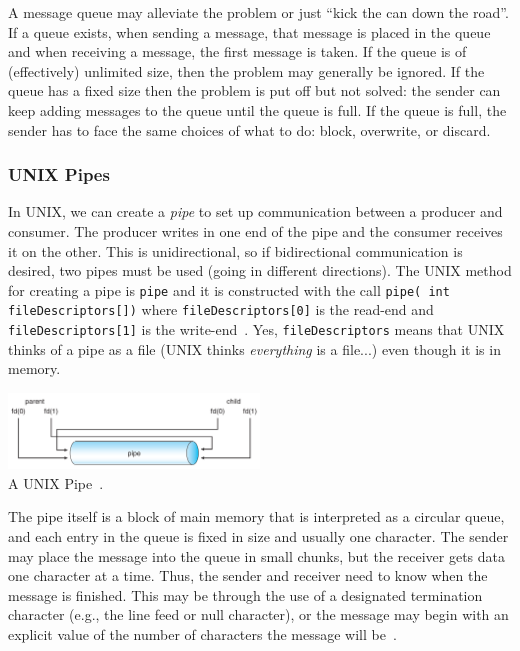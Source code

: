 A message queue may alleviate the problem or just ``kick the can down the road''. If a queue exists, when sending a message, that message is placed in the queue and when receiving a message, the first message is taken. If the queue is of (effectively) unlimited size, then the problem may generally be ignored. If the queue has a fixed size then the problem is put off but not solved: the sender can keep adding messages to the queue until the queue is full. If the queue is full, the sender has to face the same choices of what to do: block, overwrite, or discard.

\subsubsection*{UNIX Pipes}

In UNIX, we can create a \textit{pipe} to set up communication between a producer and consumer. The producer writes in one end of the pipe and the consumer receives it on the other. This is unidirectional, so if bidirectional communication is desired, two pipes must be used (going in different directions). The UNIX method for creating a pipe is \texttt{pipe} and it is constructed with the call \texttt{pipe( int fileDescriptors[])} where \texttt{fileDescriptors[0]} is the read-end and \texttt{fileDescriptors[1]} is the write-end~\cite{osc}. Yes, \texttt{fileDescriptors} means that UNIX thinks of a pipe as a file (UNIX thinks \textit{everything} is a file...) even though it is in memory.

\begin{center}
	\includegraphics[width=0.5\textwidth]{images/unix-pipe.png}\\
	A UNIX Pipe~\cite{osc}.
\end{center}

The pipe itself is a block of main memory that is interpreted as a circular queue, and each entry in the queue is fixed in size and usually one character. The sender may place the message into the queue in small chunks, but the receiver gets data one character at a time. Thus, the sender and receiver need to know when the message is finished. This may be through the use of a designated termination character (e.g., the line feed or null character), or the message may begin with an explicit value of the number of characters the message will be~\cite{mte241}.

